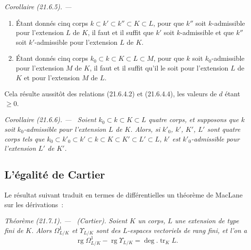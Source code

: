 \documentclass[10pt,oneside]{book}
\makeatletter
\newcommand{\setmanualcurrentlabel}[1]{\def\@currentlabel{#1}}
\newcommand{\oldpage}[2][]{%
  \setcounter{footnote}{0}%
  \marginpar{\scriptsize\textbf{#1}~|~#2}\ignorespaces}
\newenvironment{theorem}[1][]{%
  \setmanualcurrentlabel{#1}\par\medskip\noindent\itshape Théorème (#1). ---\ }{\par}
\newenvironment{corollary}[1][]{%
  \setmanualcurrentlabel{#1}\par\medskip\noindent\itshape Corollaire (#1). ---\ }{\par}
\makeatother
\begin{document}
\begin{corollary}[21.6.5]
\label{0.21.6.5-fr}
\begin{enumerate}
  \item[(i)] Étant donnés cinq corps $k\subset k'\subset k''\subset K\subset L$,
  pour que $k''$ soit $k$-admissible pour l'extension $L$ de $K$, il faut et
  il suffit que $k'$ soit $k$-admissible et que $k''$ soit $k'$-admissible
  pour l'extension $L$ de $K$.
  \item[(ii)] Étant donnés cinq corps
  $k_0\subset k\subset K\subset L\subset M$, pour que $k$ soit
  $k_0$-admissible pour l'extension $M$ de $K$, il faut et il suffit qu'il le
  soit pour l'extension $L$ de $K$ et pour l'extension $M$ de $L$.
\end{enumerate}

Cela résulte aussitôt des relations (21.6.4.2) et (21.6.4.4), les valeurs de
$d$ étant $\geqslant0$.
\end{corollary}

\begin{corollary}[21.6.6]
\label{0.21.6.6-fr}
Soient $k_0\subset k\subset K\subset L$ quatre corps, et supposons que $k$
soit $k_0$-admissible pour l'extension $L$ de $K$. Alors, si $k'_0$, $k'$,
$K'$, $L'$ sont quatre corps tels que
$k_0\subset k'_0\subset k'\subset k\subset K\subset K'\subset L'\subset L$,
$k'$ est $k'_0$-admissible pour l'extension $L'$ de $K'$.
\end{corollary}

\subsection{L'égalité de Cartier}
\label{subsection:0.21.7-fr}

Le résultat suivant traduit en termes de différentielles un théorème de
MacLane sur les dérivations~:

\oldpage[0\textsubscript{IV-1}]{170}
\begin{theorem}[21.7.1]
\label{0.21.7.1-fr}
\textnormal{(Cartier).}
Soient $K$ un corps, $L$ une extension de type fini de $K$. Alors
$\Omega^1_{L/K}$ et $\Upsilon_{L/K}$ sont des $L$-espaces vectoriels de rang
fini, et l'on a
\begin{equation}
\tag{21.7.1.1}
\label{0.21.7.1.1-fr}
\operatorname{rg}\Omega^1_{L/K}-\operatorname{rg}\Upsilon_{L/K}
=\deg.\operatorname{tr}_K L.
\end{equation}
\end{theorem}
\end{document}
